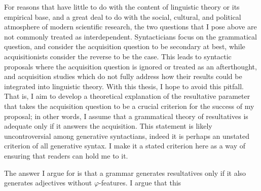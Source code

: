 \documentclass[MilwayThesis]{subfiles}
\begin{document}
For reasons that have little to do with the content of linguistic theory or its empirical base, and a great deal to do with the social, cultural, and political atmosphere of modern scientific research, the two questions that I pose above are not commonly treated as interdependent.
Syntacticians focus on the grammatical question, and consider the acquisition question to be secondary at best, while acquisitionists consider the reverse to be the case.
This leads to syntactic proposals where the acquisition question is ignored or treated as an afterthought, and acquisition studies which do not fully address how their results could be integrated into linguistic theory.
With this thesis, I hope to avoid this pitfall.
That is, I aim to develop a theoretical explanation of the resultative parameter that takes the acquisition question to be a crucial criterion for the success of my proposal; in other words, I assume that a grammatical theory of resultatives is adequate only if it answers the acquisition.
This statement is likely uncontroversial among generative syntactians, indeed it is perhaps an unstated criterion of all generative syntax.
I make it a stated criterion here as a way of ensuring that readers can hold me to it.

The answer I argue for is that a grammar generates resultatives only if it also generates adjectives without $\varphi$-features.
I argue that this 
\end{document}
